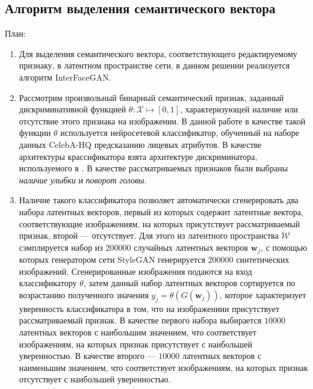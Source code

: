 

\subsection{Алгоритм выделения семантического вектора}
План:
\begin{enumerate}
\item 
Для выделения семантического вектора, соответствующего редактируемому признаку, в латентном пространстве сети, в данном решении реализуется алгоритм InterFaceGAN.

\item 
Рассмотрим произвольный бинарный семантический признак, заданный дискриминативной функцией $\theta : \mathcal X \mapsto [0,1]$, характеризующей наличие или отсутствие этого признака на изображении. 
В данной работе в качестве такой функции $\theta$ используется нейросетевой классификатор, обученный на наборе данных CelebA-HQ \cite{liu2015celeba, progressive-growing-gan} предсказанию лицевых атрибутов.
В качестве архитектуры крассификатора взята архитектуре дискриминатора, используемого в \cite{progressive-growing-gan, StyleGAN}. 
В качестве рассматриваемых признаков были выбраны \emph{наличие улыбки} и \emph{поворот головы}.

\item 
Наличие такого классификатора позволяет автоматически сгенерировать два набора латентных векторов, первый из которых содержит латентные вектора, соответствующие изображениям, на которых присутствует рассматриваемый признак, второй --- отсутствует.
Для этого из латентного пространства $\mathcal W$ сэмплируется набор из $200000$ случайных латентных векторов $\mathbf w_j$, с помощью которых генератором сети StyleGAN генерируется $200000$ синтетических изображений.
Сгенерированные изображения подаются на вход классификатору $\theta$, затем данный набор латентных векторов сортируется по возрастанию полученного значения $ y_j = \theta(G(\mathbf w_j))$, которое характеризует уверенность классификатора в том, что на изображениии присутствует рассматриваемый признак.
В качестве первого набора выбирается $10000$ латентных векторов с наибольшим значением, что соответствует изображениям, на которых признак присутствует с наибольшей уверенностью.
В качестве второго --- $10000$ латентных векторов с наименьшим значением, что соответствует изображениям, на которых признак отсутствует с наибольшей уверенностью.


\end{enumerate}

